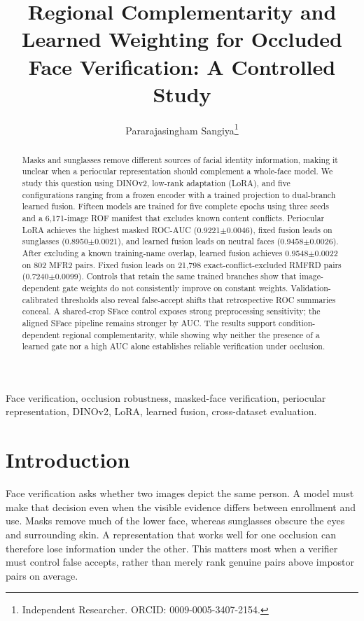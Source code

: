 \documentclass[10pt,journal,compsoc]{IEEEtran}
\title{Regional Complementarity and Learned Weighting for Occluded Face Verification: A Controlled Study}
\author{Pararajasingham Sangiya\thanks{Independent Researcher. ORCID: 0009-0005-3407-2154.}}
\begin{document}
\maketitle
\begin{abstract}
Masks and sunglasses remove different sources of facial identity information, making it unclear when a periocular representation should complement a whole-face model. We study this question using DINOv2, low-rank adaptation (LoRA), and five configurations ranging from a frozen encoder with a trained projection to dual-branch learned fusion. Fifteen models are trained for five complete epochs using three seeds and a 6,171-image ROF manifest that excludes known content conflicts. Periocular LoRA achieves the highest masked ROC-AUC (0.9221$\pm$0.0046), fixed fusion leads on sunglasses (0.8950$\pm$0.0021), and learned fusion leads on neutral faces (0.9458$\pm$0.0026). After excluding a known training-name overlap, learned fusion achieves 0.9548$\pm$0.0022 on 802 MFR2 pairs. Fixed fusion leads on 21,798 exact-conflict-excluded RMFRD pairs (0.7240$\pm$0.0099). Controls that retain the same trained branches show that image-dependent gate weights do not consistently improve on constant weights. Validation-calibrated thresholds also reveal false-accept shifts that retrospective ROC summaries conceal. A shared-crop SFace control exposes strong preprocessing sensitivity; the aligned SFace pipeline remains stronger by AUC. The results support condition-dependent regional complementarity, while showing why neither the presence of a learned gate nor a high AUC alone establishes reliable verification under occlusion.

\end{abstract}
\begin{IEEEkeywords}
Face verification, occlusion robustness, masked-face verification, periocular representation, DINOv2, LoRA, learned fusion, cross-dataset evaluation.
\end{IEEEkeywords}

\section{Introduction}
Face verification asks whether two images depict the same person. A model must make that decision even when the visible evidence differs between enrollment and use. Masks remove much of the lower face, whereas sunglasses obscure the eyes and surrounding skin. A representation that works well for one occlusion can therefore lose information under the other. This matters most when a verifier must control false accepts, rather than merely rank genuine pairs above impostor pairs on average.
\end{document}
